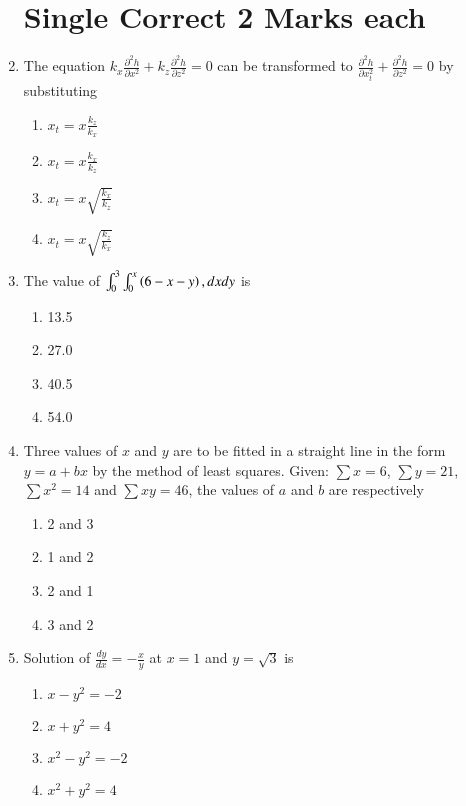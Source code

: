 \documentclass[journal]{IEEEtran}
\begin{document}
\begin{enumerate}
\section*{Single Correct 2 Marks each}
\item The equation $k_x \frac{\partial^2 h}{\partial x^2} + k_z \frac{\partial^2 h}{\partial z^2} = 0$ can be transformed to $\frac{\partial^2 h}{\partial x_{t}^2} + \frac{\partial^2 h}{\partial z^2} = 0$ by substituting
\begin{multicols}{2}
    \begin{enumerate}
        \item $x_t = x \frac{k_z}{k_x}$
        \item $x_t = x \frac{k_x}{k_z}$
        \item $x_t = x \sqrt{\frac{k_x}{k_z}}$
        \item $x_t = x \sqrt{\frac{k_z}{k_x}}$
    \end{enumerate}
\end{multicols}

\item The value of $\int_0^3 \int_0^x \left(6-x-y\right), dx dy$ is
\begin{multicols}{2}
    \begin{enumerate}
        \item 13.5
        \item 27.0
        \item 40.5
        \item 54.0
    \end{enumerate}
\end{multicols}

\item Three values of $x$ and $y$ are to be fitted in a straight line in the form $y = a + bx$ by the method of least squares. Given: $\sum x = 6$, $\sum y = 21$, $\sum x^2 = 14$ and $\sum xy = 46$, the values of $a$ and $b$ are respectively
\begin{multicols}{2}
    \begin{enumerate}
        \item 2 and 3
        \item 1 and 2
        \item 2 and 1
        \item 3 and 2
    \end{enumerate}
\end{multicols}

\item Solution of $\frac{dy}{dx} = -\frac{x}{y}$ at $x=1$ and $y=\sqrt{3}$ is
\begin{multicols}{2}
    \begin{enumerate}
        \item $x-y^2 = -2$
        \item $x + y^2 = 4$
        \item $x^2 - y^2 = -2$
        \item $x^2 + y^2 = 4$
    \end{enumerate}
\end{multicols}


\end{enumerate}
\end{document}
